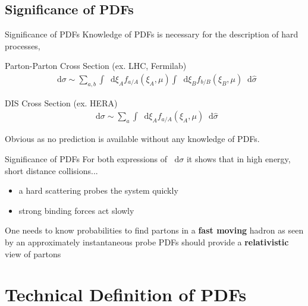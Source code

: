 \documentclass[aspectratio=169,xcolor=dvipsnames]{beamer}
\newcommand*\dif{\mathop{}\!\mathrm{d}}
\begin{document}
\subsection{Significance of PDFs}
\begin{frame}{Significance of PDFs}
	\vskip0.1in
	Knowledge of PDFs is necessary for the description of hard processes, \vskip0.1in
	\begin{block}{Parton-Parton Cross Section (ex. LHC, Fermilab)}
		\begin{align*}
		\dif\sigma \sim \sum_{a,b}\int \dif \xi_A f_{a/A}(\xi_A,\mu) \int  \dif \xi_B f_{b/B}(\xi_B,\mu) \dif\hat{\sigma}
	\end{align*}
	\end{block}\vskip0.05in
	\begin{block}{DIS Cross Section (ex. HERA)}
		\begin{align*}
			\dif\sigma \sim \sum_{a}\int \dif \xi_A f_{a/A}(\xi_A,\mu) \dif\hat{\sigma}
		\end{align*}
	\end{block}\vskip0.1in
	Obvious as no prediction is available without any knowledge of PDFs.
\end{frame}

\begin{frame}{Significance of PDFs}
	For both expressions of $\dif\sigma$ it shows that in high energy, short distance collisions...\vskip0.1in
	\begin{itemize}
		\item a hard scattering probes the system quickly 
		\item strong binding forces act slowly
	\end{itemize} \vskip0.15in
	\MVRightarrow{} One needs to know probabilities to find partons in a \textbf{fast moving} hadron as seen by an approximately instantaneous probe \vskip0.1in
	\MVRightArrow{} PDFs should provide a \textbf{relativistic} view of partons
\end{frame}

\section{Technical Definition of PDFs}
\end{document}
